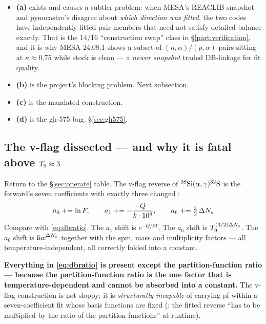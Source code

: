 \begin{itemize}
\item \textbf{(a)} exists and causes a subtler problem: when MESA's REACLIB
      snapshot and pynucastro's disagree about \emph{which direction was
      fitted}, the two codes have independently-fitted pair members that need
      not satisfy detailed balance exactly. That is the 14/16 ``construction
      swap'' class in \S\ref{part:verification}, and it is why MESA 24.08.1
      shows a subset of $(n,\alpha)/(p,\alpha)$ pairs sitting at
      $\kappa \approx 0.75$ while stock is clean  --- a
      \emph{newer snapshot} traded DB-linkage for fit quality.
\item \textbf{(b)} is the project's blocking problem. Next subsection.
\item \textbf{(c)} is the mandated construction.
\item \textbf{(d)} is the gh-575 bug. \S\ref{sec:gh575}.
\end{itemize}

\subsection{The v-flag dissected --- and why it is fatal above \texorpdfstring{$\Tn \approx 3$}{T9 ~ 3}}
\label{sec:vflag}

Return to the \S\ref{sec:onerate} table. The v-flag reverse of
$\nuc{Si}{28}(\alpha,\gamma)\nuc{S}{32}$ is the forward's seven coefficients
with exactly three changed \citep{rauscher2000,smith2023}:
%
\begin{equation*}
a_0 \mathrel{+}= \ln F, \qquad
a_1 \mathrel{+}= -\frac{Q}{k\cdot10^9}, \qquad
a_6 \mathrel{+}= \tfrac{3}{2}\,\dNs
\end{equation*}
%
Compare with \eqref{eq:dbratio}. The $a_1$ shift is $e^{-Q/kT}$. The $a_6$ shift
is $\Tn^{(3/2)\dNs}$. The $a_0$ shift is $\fac^{\dNs}$ together with the spin,
mass and multiplicity factors --- all temperature-independent, all correctly
folded into a constant.

\begin{result}
\textbf{Everything in \eqref{eq:dbratio} is present except the
partition-function ratio --- because the partition-function ratio is the one
factor that is temperature-dependent and cannot be absorbed into a constant.}
The v-flag construction is not sloppy; it is \emph{structurally incapable} of
carrying pf within a seven-coefficient fit whose basis functions are fixed
(\citealp{rauscher2000}: the fitted reverse ``has to be multiplied by the ratio
of the partition functions'' at runtime).
\end{result}

